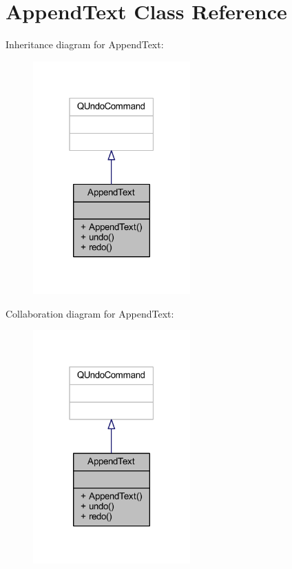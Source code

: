 \hypertarget{class_append_text}{}\section{Append\+Text Class Reference}
\label{class_append_text}


Inheritance diagram for Append\+Text\+:\nopagebreak
\begin{figure}[H]
\begin{center}
\leavevmode
\includegraphics[width=171pt]{class_append_text__inherit__graph}
\end{center}
\end{figure}


Collaboration diagram for Append\+Text\+:\nopagebreak
\begin{figure}[H]
\begin{center}
\leavevmode
\includegraphics[width=171pt]{class_append_text__coll__graph}
\end{center}
\end{figure}
